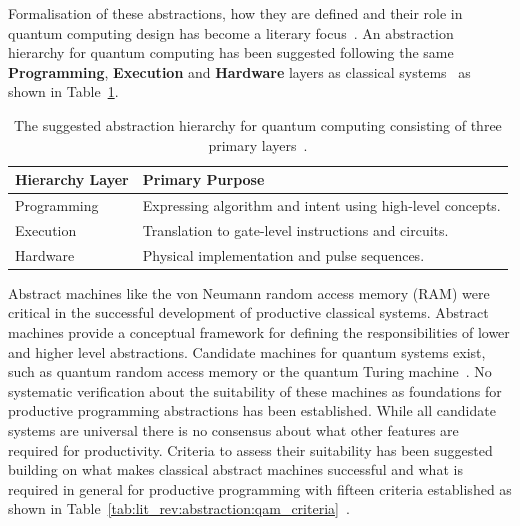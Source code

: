 Formalisation of these abstractions, how they are defined and their role in quantum computing design has become a literary focus~\cite{DiMatteo2024AbstractionHierarchy,nunez_corrales2025betterabstractmachines}.
An abstraction hierarchy for quantum computing has been suggested following the same \textbf{Programming}, \textbf{Execution} and \textbf{Hardware} layers as classical systems~\cite{DiMatteo2024AbstractionHierarchy} as shown in Table~\ref{tab:lit_rev:abstraction:quantum_hierarchy}.

\begin{table}[htbp]
    \centering
    \caption{The suggested abstraction hierarchy for quantum computing consisting of three primary layers~\cite{DiMatteo2024AbstractionHierarchy}.}
    \label{tab:lit_rev:abstraction:quantum_hierarchy}
    \begin{tabularx}{\textwidth}{@{}lX@{}}
        \toprule
        \textbf{Hierarchy Layer} & \textbf{Primary Purpose}                                   \\ \midrule
        Programming              & Expressing algorithm and intent using high-level concepts. \\
        Execution                & Translation to gate-level instructions and circuits.       \\
        Hardware                 & Physical implementation and pulse sequences.               \\ \bottomrule
    \end{tabularx}
\end{table}

Abstract machines like the von Neumann random access memory (RAM) were critical in the successful development of productive classical systems.
Abstract machines provide a conceptual framework for defining the responsibilities of lower and higher level abstractions.
Candidate machines for quantum systems exist, such as quantum random access memory or the quantum Turing machine~\cite{nunez_corrales2025betterabstractmachines}.
No systematic verification about the suitability of these machines as foundations for productive programming abstractions has been established.
While all candidate systems are universal there is no consensus about what other features are required for productivity.
Criteria to assess their suitability has been suggested building on what makes classical abstract machines successful and what is required in general for productive programming with fifteen criteria established as shown in Table~\ref{tab:lit_rev:abstraction:qam_criteria}~\cite{nunez_corrales2025betterabstractmachines}.

